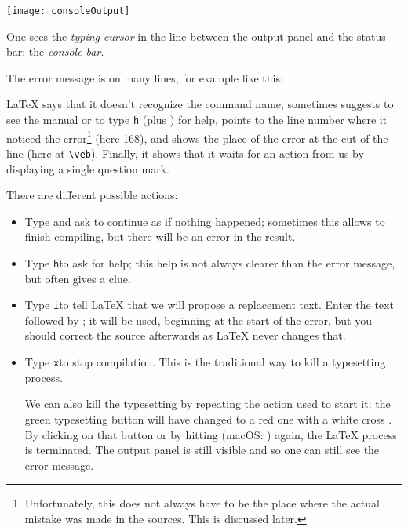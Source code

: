 \begin{center}\label{fig:consoleOutput}
\texttt{[image: consoleOutput]}
\end{center}

One sees the \emph{typing cursor} in the line between the output panel and the status bar: the \emph{console bar}.

The error message is on many lines, for example like this:
\smallskip


{\LaTeX} says that it doesn't recognize the command name, sometimes suggests to see the manual or to type \verb|h| (plus \Return) for help, points to the line number where it noticed the error\footnote{Unfortunately, this does not always have to be the place where the actual mistake was made in the sources. This is discussed later.} (here 168), and shows the place of the error at the cut of the line (here at \verb|\veb|). Finally, it shows that it waits for an action from us by displaying a single question mark.

There are different possible actions:
\begin{itemize}
\item Type \Return and ask to continue as if nothing happened; sometimes this allows to finish compiling, but there will be an error in the result.
\item Type \verb+h+\Return to ask for help; this help is not always clearer than the error message, but often gives a clue.
\item Type \verb+i+\Return to tell {\LaTeX} that we will propose a replacement text. Enter the text followed by \Return; it will be used, beginning at the start of the error, but you should correct the source afterwards as {\LaTeX} never changes that.
\item Type \verb+x+\Return to stop compilation. This is the traditional {\AllTeX} way to kill a typesetting process.

We can also kill the typesetting by repeating the action used to start it: the green typesetting button will have changed to a red one with a white cross .
By clicking on that button or by hitting  (macOS: ) again, the {\LaTeX} process is terminated. The output panel is still visible and so one can still see the error message.
\end{itemize}


